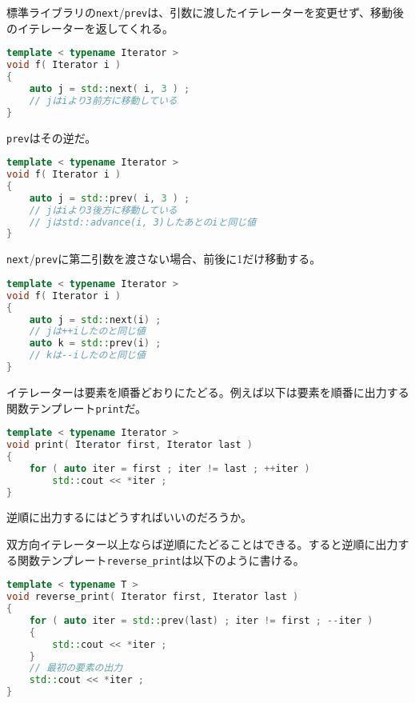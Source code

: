 \ifTombow\pagebreak\fi
標準ライブラリの\texttt{next}/\texttt{prev}は、引数に渡したイテレーターを変更せず、移動後のイテレーターを返してくれる。

\begin{lstlisting}[language={C++}]
template < typename Iterator >
void f( Iterator i )
{
    auto j = std::next( i, 3 ) ;
    // jはiより3前方に移動している
}
\end{lstlisting}

\texttt{prev}はその逆だ。

\begin{lstlisting}[language={C++}]
template < typename Iterator >
void f( Iterator i )
{
    auto j = std::prev( i, 3 ) ;
    // jはiより3後方に移動している
    // jはstd::advance(i, 3)したあとのiと同じ値
}
\end{lstlisting}

\texttt{next}/\texttt{prev}に第二引数を渡さない場合、前後に1だけ移動する。

\begin{lstlisting}[language={C++}]
template < typename Iterator >
void f( Iterator i )
{
    auto j = std::next(i) ;
    // jは++iしたのと同じ値
    auto k = std::prev(i) ;
    // kは--iしたのと同じ値
}
\end{lstlisting}

\clearpage
{}

イテレーターは要素を順番どおりにたどる。例えば以下は要素を順番に出力する関数テンプレート\texttt{print}だ。

\begin{lstlisting}[language={C++}]
template < typename Iterator >
void print( Iterator first, Iterator last )
{
    for ( auto iter = first ; iter != last ; ++iter )
        std::cout << *iter ;
}
\end{lstlisting}

逆順に出力するにはどうすればいいのだろうか。

双方向イテレーター以上ならば逆順にたどることはできる。すると逆順に出力する関数テンプレート\texttt{reverse\_print}は以下のように書ける。

\begin{lstlisting}[language={C++}]
template < typename T >
void reverse_print( Iterator first, Iterator last )
{
    for ( auto iter = std::prev(last) ; iter != first ; --iter )
    {
        std::cout << *iter ;
    }
    // 最初の要素の出力
    std::cout << *iter ;
}
\end{lstlisting}

